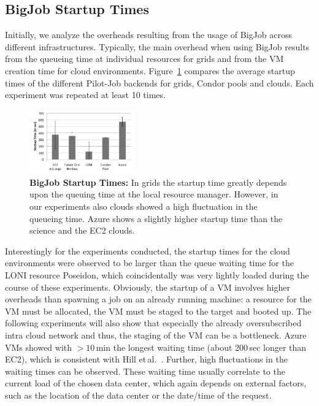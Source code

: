 \documentclass[conference,final]{IEEEtran}
\newcommand{\up}{\vspace*{-1em}}
\begin{document}
\subsection{BigJob Startup Times} 
\up
Initially, we analyze the overheads resulting from the usage of BigJob across
different infrastructures. Typically, the main overhead when using
BigJob results from the queueing time at individual resources for
grids and from the VM creation time for cloud environments.
Figure~\ref{fig:performance_setup_time} compares the average startup times of
the different Pilot-Job backends for grids, Condor pools and clouds. Each 
experiment was repeated at least 10 times.

\begin{figure}[htbp]
    \centering
        \includegraphics[width=0.4\textwidth]{performance/setup-times}
    \caption{\textbf{BigJob Startup Times:} In grids the startup time
      greatly depends upon the queuing time at the local resource
      manager. However, in our experiments also clouds showed a high
      fluctuation in the queueing time. Azure shows a slightly higher
      startup time than the science and the EC2 clouds.\up}
    \label{fig:performance_setup_time}
\end{figure}

Interestingly for the experiments conducted, the startup times for the
cloud environments were observed to be larger than the queue waiting time
for the LONI resource Poseidon, which coincidentally was very lightly
loaded during the course of these experiments. Obviously, the startup
of a VM involves higher overheads than spawning a job on an already
running machine: a resource for the VM must be allocated, the VM must
be staged to the target and booted up. The following experiments will
also show that especially the already oversubscribed intra cloud
network and thus, the staging of the VM can be a bottleneck. Azure VMs
showed with $>10$\,min the longest waiting time (about 200\,sec longer than EC2), which
is consistent with Hill et\,al.~\cite{hill10}.  Further,
high fluctuations in the waiting times can be observed. These waiting time
usually correlate to the current load of the chosen data center, which again
depends on external factors, such as the location of the data center or 
the date/time of the request.
\end{document}
